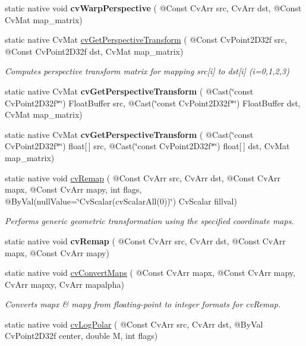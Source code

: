 \begin{DoxyCompactItemize}
static native void {\bfseries cv\+Warp\+Perspective} ( @Const Cv\+Arr src, Cv\+Arr dst, @Const Cv\+Mat map\+\_\+matrix)
\item 
static native Cv\+Mat \hyperlink{group__imgproc__c_ga90db3b12f84ee1bea538d6d88bab49c3}{cv\+Get\+Perspective\+Transform} ( @Const Cv\+Point2\+D32f src, @Const Cv\+Point2\+D32f dst, Cv\+Mat map\+\_\+matrix)
\begin{DoxyCompactList}\small\item\em Computes perspective transform matrix for mapping src\mbox{[}i\mbox{]} to dst\mbox{[}i\mbox{]} (i=0,1,2,3) \end{DoxyCompactList}\item 
static native Cv\+Mat {\bfseries cv\+Get\+Perspective\+Transform} ( @Cast(\char`\"{}const Cv\+Point2\+D32f$\ast$\char`\"{}) Float\+Buffer src, @Cast(\char`\"{}const Cv\+Point2\+D32f$\ast$\char`\"{}) Float\+Buffer dst, Cv\+Mat map\+\_\+matrix)
\item 
static native Cv\+Mat {\bfseries cv\+Get\+Perspective\+Transform} ( @Cast(\char`\"{}const Cv\+Point2\+D32f$\ast$\char`\"{}) float\mbox{[}$\,$\mbox{]} src, @Cast(\char`\"{}const Cv\+Point2\+D32f$\ast$\char`\"{}) float\mbox{[}$\,$\mbox{]} dst, Cv\+Mat map\+\_\+matrix)
\item 
static native void \hyperlink{group__imgproc__c_ga5fc4449699da7b00973991b5b610efbb}{cv\+Remap} ( @Const Cv\+Arr src, Cv\+Arr dst, @Const Cv\+Arr mapx, @Const Cv\+Arr mapy, int flags, @By\+Val(null\+Value=\char`\"{}Cv\+Scalar(cv\+Scalar\+All(0))\char`\"{}) Cv\+Scalar fillval)
\begin{DoxyCompactList}\small\item\em Performs generic geometric transformation using the specified coordinate maps. \end{DoxyCompactList}\item 
static native void {\bfseries cv\+Remap} ( @Const Cv\+Arr src, Cv\+Arr dst, @Const Cv\+Arr mapx, @Const Cv\+Arr mapy)
\item 
static native void \hyperlink{group__imgproc__c_ga9e8c4e8b6609f6bad114d7a6e597d530}{cv\+Convert\+Maps} ( @Const Cv\+Arr mapx, @Const Cv\+Arr mapy, Cv\+Arr mapxy, Cv\+Arr mapalpha)
\begin{DoxyCompactList}\small\item\em Converts mapx \& mapy from floating-\/point to integer formats for cv\+Remap. \end{DoxyCompactList}\item 
static native void \hyperlink{group__imgproc__c_gaa181829e06fd0d2f59e112e2a5e27129}{cv\+Log\+Polar} ( @Const Cv\+Arr src, Cv\+Arr dst, @By\+Val Cv\+Point2\+D32f center, double M, int flags)

\end{DoxyCompactItemize}
